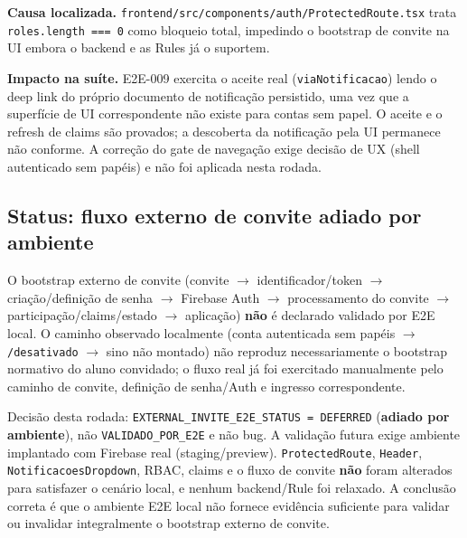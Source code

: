 \textbf{Causa localizada.} \texttt{frontend/src/components/auth/ProtectedRoute.tsx}
trata \texttt{roles.length === 0} como bloqueio total, impedindo o bootstrap de
convite na UI embora o backend e as Rules já o suportem.

\textbf{Impacto na suíte.} E2E-009 exercita o aceite real
(\texttt{viaNotificacao}) lendo o deep link do próprio documento de notificação
persistido, uma vez que a superfície de UI correspondente não existe para contas
sem papel. O aceite e o refresh de claims são provados; a descoberta da
notificação pela UI permanece não conforme. A correção do gate de navegação
exige decisão de UX (shell autenticado sem papéis) e não foi aplicada nesta
rodada.

\subsection{Status: fluxo externo de convite adiado por ambiente}

O bootstrap externo de convite (convite $\rightarrow$ identificador/token
$\rightarrow$ criação/definição de senha $\rightarrow$ Firebase Auth $\rightarrow$
processamento do convite $\rightarrow$ participação/claims/estado $\rightarrow$
aplicação) \textbf{não} é declarado validado por E2E local. O caminho observado
localmente (conta autenticada sem papéis $\rightarrow$ \texttt{/desativado}
$\rightarrow$ sino não montado) não reproduz necessariamente o bootstrap
normativo do aluno convidado; o fluxo real já foi exercitado manualmente pelo
caminho de convite, definição de senha/Auth e ingresso correspondente.

Decisão desta rodada: \texttt{EXTERNAL\_INVITE\_E2E\_STATUS = DEFERRED}
(\textbf{adiado por ambiente}), não \texttt{VALIDADO\_POR\_E2E} e não bug. A
validação futura exige ambiente implantado com Firebase real
(staging/preview). \texttt{ProtectedRoute}, \texttt{Header},
\texttt{NotificacoesDropdown}, RBAC, claims e o fluxo de convite \textbf{não}
foram alterados para satisfazer o cenário local, e nenhum backend/Rule foi
relaxado. A conclusão correta é que o ambiente E2E local não fornece evidência
suficiente para validar ou invalidar integralmente o bootstrap externo de
convite.
